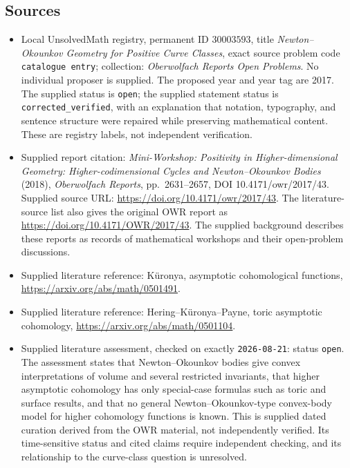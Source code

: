 \documentclass[11pt]{article}
\begin{document}
\subsection{Sources}
\begin{itemize}
\item Local UnsolvedMath registry, permanent ID \(30003593\), title \emph{Newton--Okounkov Geometry for Positive Curve Classes}, exact source problem code \texttt{catalogue entry}; collection: \emph{Oberwolfach Reports Open Problems}. No individual proposer is supplied. The proposed year and year tag are 2017. The supplied status is \texttt{open}; the supplied statement status is \texttt{corrected\_verified}, with an explanation that notation, typography, and sentence structure were repaired while preserving mathematical content. These are registry labels, not independent verification.
\item Supplied report citation: \emph{Mini-Workshop: Positivity in Higher-dimensional Geometry: Higher-codimensional Cycles and Newton--Okounkov Bodies} (2018), \emph{Oberwolfach Reports}, pp.\ 2631--2657, DOI 10.4171/owr/2017/43. Supplied source URL: \url{https://doi.org/10.4171/owr/2017/43}. The literature-source list also gives the original OWR report as \url{https://doi.org/10.4171/OWR/2017/43}. The supplied background describes these reports as records of mathematical workshops and their open-problem discussions.
\item Supplied literature reference: K\"uronya, asymptotic cohomological functions, \url{https://arxiv.org/abs/math/0501491}.
\item Supplied literature reference: Hering--K\"uronya--Payne, toric asymptotic cohomology, \url{https://arxiv.org/abs/math/0501104}.
\item Supplied literature assessment, checked on exactly \texttt{2026-08-21}: status \texttt{open}. The assessment states that Newton--Okounkov bodies give convex interpretations of volume and several restricted invariants, that higher asymptotic cohomology has only special-case formulas such as toric and surface results, and that no general Newton--Okounkov-type convex-body model for higher cohomology functions is known. This is supplied dated curation derived from the OWR material, not independently verified. Its time-sensitive status and cited claims require independent checking, and its relationship to the curve-class question is unresolved.
\end{itemize}
\end{document}

